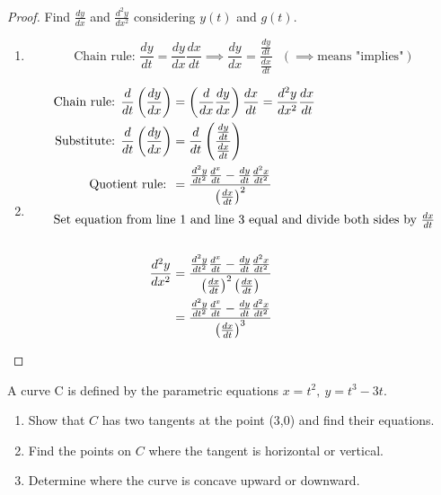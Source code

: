     \begin{minipage}{\linewidth}
      \begin{proof}
        Find $\frac{dy}{dx}$ and $\frac{d^2 y}{dx^2}$ considering $y(t)$ and $g(t)$.
        \begin{enumerate}
          \item \begin{equation*}
            \text{Chain rule: } \frac{dy}{dt} = \frac{dy}{dx}\frac{dx}{dt} \implies \frac{dy}{dx} = \frac{\frac{dy}{dt}}{\frac{dx}{dt}} \ \ \ (\implies \text{means "implies"})
          \end{equation*}
          \item \begin{align*}
            \text{Chain rule: } \frac{d}{dt}\left(\frac{dy}{dx}\right) &= \left(\frac{d}{dx}\frac{dy}{dx}\right)\frac{dx}{dt} = \frac{d^2 y}{dx^2}\frac{dx}{dt} \\
            \text{Substitute: } \frac{d}{dt}\left(\frac{dy}{dx}\right) &= \frac{d}{dt}\left(\frac{\frac{dy}{dt}}{\frac{dx}{dt}}\right) \\
            \text{Quotient rule: } &= \frac{\frac{d^2 y}{dt^2}\frac{d^x}{dt} - \frac{dy}{dt}\frac{d^2 x}{dt^2}}{\left(\frac{dx}{dt}\right)^2} \\
            \intertext{Set equation from line 1 and line 3 equal and divide both sides by $\frac{dx}{dt}$} \\
            \frac{d^2 y}{dx^2} &= \frac{\frac{d^2 y}{dt^2}\frac{d^x}{dt} - \frac{dy}{dt}\frac{d^2 x}{dt^2}}{\left(\frac{dx}{dt}\right)^2 \left(\frac{dx}{dt}\right)} \\
            &= \frac{\frac{d^2 y}{dt^2}\frac{d^x}{dt} - \frac{dy}{dt}\frac{d^2 x}{dt^2}}{\left(\frac{dx}{dt}\right)^3}
          \end{align*}
        \end{enumerate}
      \end{proof}
    \end{minipage}
    \begin{example}
      A curve C is defined by the parametric equations $ {x=t^2 ,\ y=t^3 -3t }$.
      \begin{enumerate}
        \item Show that $C$ has two tangents at the point (3,0) and find their equations.
        \item Find the points on $C$ where the tangent is horizontal or vertical.
        \item Determine where the curve is concave upward or downward.
      \end{enumerate}
    \end{example}
